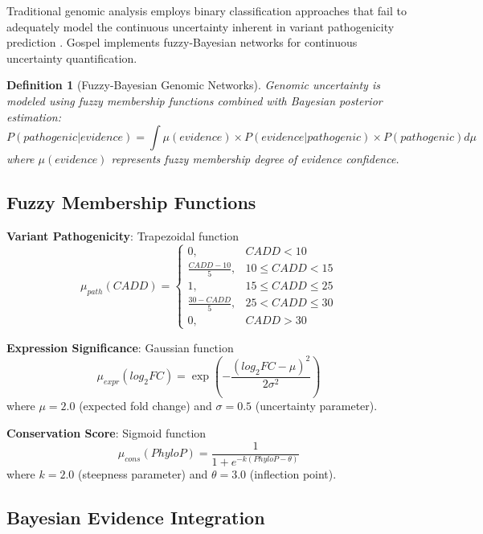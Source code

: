\documentclass[12pt,a4paper]{article}
\newtheorem{definition}[theorem]{Definition}
\begin{document}
Traditional genomic analysis employs binary classification approaches that fail to adequately model the continuous uncertainty inherent in variant pathogenicity prediction \cite{richards2015standards, landrum2018clinvar}. Gospel implements fuzzy-Bayesian networks for continuous uncertainty quantification.

\begin{definition}[Fuzzy-Bayesian Genomic Networks]
Genomic uncertainty is modeled using fuzzy membership functions combined with Bayesian posterior estimation:
\begin{equation}
P(pathogenic|evidence) = \int \mu(evidence) \times P(evidence|pathogenic) \times P(pathogenic) d\mu
\end{equation}
where $\mu(evidence)$ represents fuzzy membership degree of evidence confidence.
\end{definition}

\subsection{Fuzzy Membership Functions}

\textbf{Variant Pathogenicity}: Trapezoidal function
\begin{equation}
\mu_{path}(CADD) = \begin{cases}
0, & CADD < 10 \\
\frac{CADD - 10}{5}, & 10 \leq CADD < 15 \\
1, & 15 \leq CADD \leq 25 \\
\frac{30 - CADD}{5}, & 25 < CADD \leq 30 \\
0, & CADD > 30
\end{cases}
\end{equation}

\textbf{Expression Significance}: Gaussian function
\begin{equation}
\mu_{expr}(log_2FC) = \exp\left(-\frac{(log_2FC - \mu)^2}{2\sigma^2}\right)
\end{equation}
where $\mu = 2.0$ (expected fold change) and $\sigma = 0.5$ (uncertainty parameter).

\textbf{Conservation Score}: Sigmoid function
\begin{equation}
\mu_{cons}(PhyloP) = \frac{1}{1 + e^{-k(PhyloP - \theta)}}
\end{equation}
where $k = 2.0$ (steepness parameter) and $\theta = 3.0$ (inflection point).

\subsection{Bayesian Evidence Integration}
\end{document}

